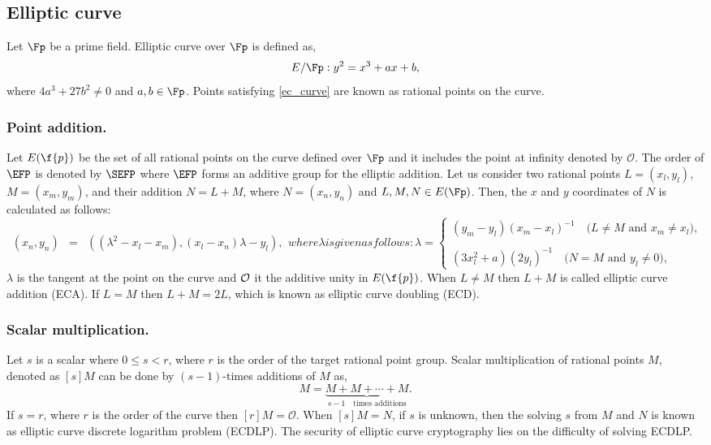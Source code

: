\subsection{Elliptic curve \cite{washington2003elliptic}}
Let $\Fp$ be a prime field. Elliptic curve over $\Fp$ is defined as,
\begin{equation}\label{ec_curve}
E/\Fp : y^2=x^3+ax+b,
\end{equation}
where $ 4a^3+27b^2 \neq 0$ and $a,b \in \Fp$. Points satisfying \eqref{ec_curve} are known as rational points on the curve.

\subsubsection{Point addition.}
Let $E(\f{p})$ be the set of all rational points on the curve defined over $\Fp$ and it includes the point at infinity denoted by $\mathcal{O}$.
The order of $\EFP$ is denoted by $\SEFP$ where $\EFP$ forms an additive group for the elliptic addition.
Let us consider two rational points $L = (x_l, y_l)$, $M = (x_m, y_m)$, and their addition $N = L + M$, where $\textit{N} = (x_n, y_n)$ and $L, M, N\in E(\Fp)$. Then, the $x$ and $y$ coordinates of $N$ is calculated as follows:
\begin{subequations}
\begin{eqnarray}\label{eq:point_add}
(x_n ,y_n) & = & ((\lambda^2-x_l-x_m ),  (x_l-x_n)\lambda - y_l), 
\end{eqnarray}
where \mbox{$\lambda$} is given as follows:
\begin{equation}\label{eq:point_solpe}
\textstyle \lambda = 
\begin{cases}
 \textstyle (y_m - y_l)(x_m -x_l)^{-1} \quad \mbox{($L \neq M$ and $x_m \neq x_l$)},\\\\
 \textstyle  (3x_l^2+a)(2y_l)^{-1} \quad  \mbox{($N = M$ and $y_l\neq 0$)} ,
\end{cases}
\end{equation}
\end{subequations}
$\lambda$ is the tangent at the point on the curve and $\cal O$ it the additive unity in $E(\f{p})$. When $L \neq M$ then $L+M$ is called elliptic curve addition (ECA). If $L=M$ then $L+M=2L$, which is known as elliptic curve doubling (ECD). 
\subsubsection{Scalar multiplication.}
Let $s$ is a scalar where $0 \leq s < r$, where $r$ is the order of the target rational point group. Scalar multiplication of rational points $M$, denoted as $[s]M$ can be done by $(s-1)$-times additions of $M$ as,
\begin{equation}
[s]M = \underbrace{M+M+ \cdots +M}_{s-1 \quad \mbox{times additions}}.
\end{equation}
If $s = r$, where $r$ is the order of the curve then $[r]M = \mathcal{O}$. When $[s]M = N$, if $s$ is unknown, then the solving $s$ from $M$ and $N$ is known as elliptic curve discrete logarithm problem (ECDLP). The security of elliptic curve cryptography lies on the difficulty of solving ECDLP.


